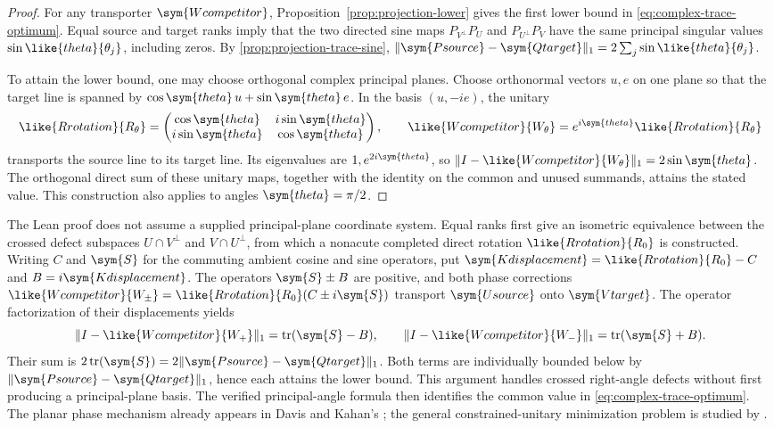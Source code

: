 \begin{proof}
For any transporter $\sym{Wcompetitor}$, Proposition~\ref{prop:projection-lower}
gives the first lower bound in \cref{eq:complex-trace-optimum}.
Equal source and target ranks imply that the two directed sine maps
$P_{V^\perp}P_U$ and $P_{U^\perp}P_V$ have the same principal singular
values $\sin\like{theta}{\theta_j}$, including zeros. By
\cref{prop:projection-trace-sine},
$\|\sym{Psource}-\sym{Qtarget}\|_1=2\sum_j\sin\like{theta}{\theta_j}$.

To attain the lower bound, one may choose orthogonal complex principal
planes. Choose orthonormal vectors $u,e$ on one plane so that the target
line is spanned by $\cos\sym{theta}\,u+\sin\sym{theta}\,e$. In the basis
$(u,-ie)$, the unitary
\begin{equation}
 \like{Rrotation}{R_\theta}=
 \begin{pmatrix}\cos\sym{theta}&i\sin\sym{theta}\\
                 i\sin\sym{theta}&\cos\sym{theta}\end{pmatrix},\qquad
 \like{Wcompetitor}{W_\theta}=e^{i\sym{theta}}\like{Rrotation}{R_\theta}
 \label{eq:complex-phase}
\end{equation}
transports the source line to its target line. Its eigenvalues are
$1,e^{2i\sym{theta}}$, so $\|I-\like{Wcompetitor}{W_\theta}\|_1=2\sin\sym{theta}$.
The orthogonal direct sum of these unitary maps, together with the identity
on the common and unused summands, attains the stated value. This
construction also applies to angles $\sym{theta}=\pi/2$.
\end{proof}

The Lean proof does not assume a supplied principal-plane coordinate
system. Equal ranks first give an isometric equivalence between the
crossed defect subspaces $U\cap V^\perp$ and $V\cap U^\perp$, from which
a nonacute completed direct rotation $\like{Rrotation}{R_0}$ is constructed.
Writing $C$ and $\sym{S}$ for the commuting ambient cosine and sine
operators, put $\sym{Kdisplacement}=\like{Rrotation}{R_0}-C$ and
$B=i\sym{Kdisplacement}$. The operators $\sym{S}\pm B$ are positive, and
both phase corrections
$\like{Wcompetitor}{W_\pm}=\like{Rrotation}{R_0}(C\pm i\sym{S})$
transport $\sym{Usource}$ onto $\sym{Vtarget}$. The operator factorization of their
displacements yields
\[
 \|I-\like{Wcompetitor}{W_+}\|_1=\operatorname{tr}(\sym{S}-B),\qquad
 \|I-\like{Wcompetitor}{W_-}\|_1=\operatorname{tr}(\sym{S}+B).
\]
Their sum is $2\operatorname{tr}(\sym{S})=2\|\sym{Psource}-\sym{Qtarget}\|_1$.
Both terms are individually bounded below by
$\|\sym{Psource}-\sym{Qtarget}\|_1$, hence each attains the lower bound.
This argument handles crossed right-angle defects without first producing a
principal-plane basis. The verified principal-angle formula then identifies
the common value in \cref{eq:complex-trace-optimum}. The planar phase
mechanism already appears in Davis and Kahan's
\citep[Example~4.2]{davis1970rotation}; the general constrained-unitary
minimization problem is studied by \citet{bolotnikov2001minimal}.

